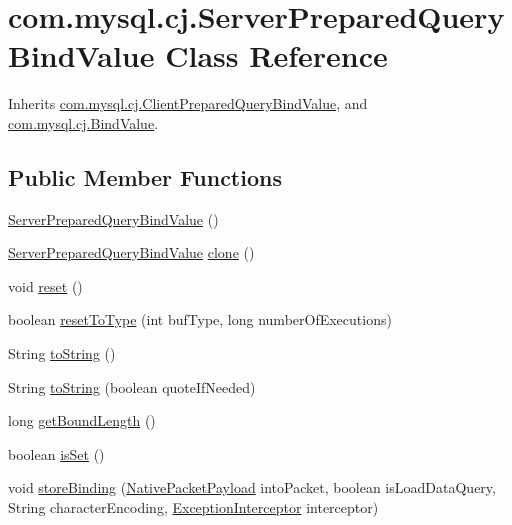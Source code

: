 \hypertarget{classcom_1_1mysql_1_1cj_1_1_server_prepared_query_bind_value}{}\section{com.\+mysql.\+cj.\+Server\+Prepared\+Query\+Bind\+Value Class Reference}
\label{classcom_1_1mysql_1_1cj_1_1_server_prepared_query_bind_value}


Inherits \mbox{\hyperlink{classcom_1_1mysql_1_1cj_1_1_client_prepared_query_bind_value}{com.\+mysql.\+cj.\+Client\+Prepared\+Query\+Bind\+Value}}, and \mbox{\hyperlink{interfacecom_1_1mysql_1_1cj_1_1_bind_value}{com.\+mysql.\+cj.\+Bind\+Value}}.

\subsection*{Public Member Functions}
\begin{DoxyCompactItemize}
\item 
\mbox{\hyperlink{classcom_1_1mysql_1_1cj_1_1_server_prepared_query_bind_value_a955e5b4560fdfb4c41537aabdc08015c}{Server\+Prepared\+Query\+Bind\+Value}} ()
\item 
\mbox{\hyperlink{classcom_1_1mysql_1_1cj_1_1_server_prepared_query_bind_value}{Server\+Prepared\+Query\+Bind\+Value}} \mbox{\hyperlink{classcom_1_1mysql_1_1cj_1_1_server_prepared_query_bind_value_a39d3a4826771b5a98c108bcbfd630d0f}{clone}} ()
\item 
void \mbox{\hyperlink{classcom_1_1mysql_1_1cj_1_1_server_prepared_query_bind_value_ace2cd66fa5ce7b60d1ddb0c919ec5783}{reset}} ()
\item 
boolean \mbox{\hyperlink{classcom_1_1mysql_1_1cj_1_1_server_prepared_query_bind_value_a425bdbe24e9b3820488c0f936315229a}{reset\+To\+Type}} (int buf\+Type, long number\+Of\+Executions)
\item 
String \mbox{\hyperlink{classcom_1_1mysql_1_1cj_1_1_server_prepared_query_bind_value_a42362563dfa8fb2023de2d0c6734abff}{to\+String}} ()
\item 
String \mbox{\hyperlink{classcom_1_1mysql_1_1cj_1_1_server_prepared_query_bind_value_a05b09f6b71e326440cac60a365ec6b00}{to\+String}} (boolean quote\+If\+Needed)
\item 
long \mbox{\hyperlink{classcom_1_1mysql_1_1cj_1_1_server_prepared_query_bind_value_aeb5d121e9780688fc03f8edf1404fcd9}{get\+Bound\+Length}} ()
\item 
boolean \mbox{\hyperlink{classcom_1_1mysql_1_1cj_1_1_server_prepared_query_bind_value_a53324f0183c3d2b6d99247114a32b60c}{is\+Set}} ()
\item 
void \mbox{\hyperlink{classcom_1_1mysql_1_1cj_1_1_server_prepared_query_bind_value_a80d68503220f9c21865a8815b7793258}{store\+Binding}} (\mbox{\hyperlink{classcom_1_1mysql_1_1cj_1_1protocol_1_1a_1_1_native_packet_payload}{Native\+Packet\+Payload}} into\+Packet, boolean is\+Load\+Data\+Query, String character\+Encoding, \mbox{\hyperlink{interfacecom_1_1mysql_1_1cj_1_1exceptions_1_1_exception_interceptor}{Exception\+Interceptor}} interceptor)
\end{DoxyCompactItemize}
